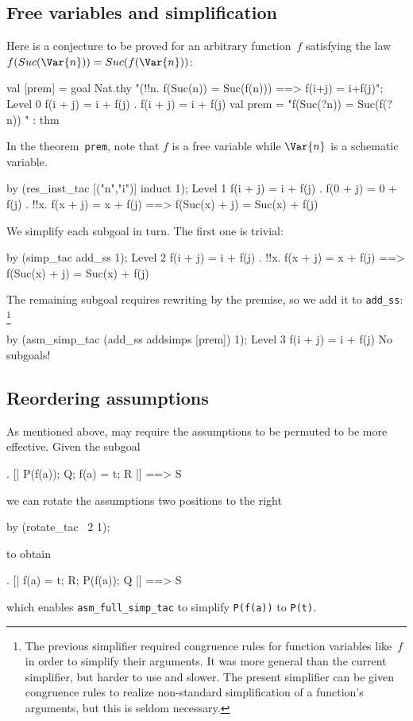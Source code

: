 \subsection{Free variables and simplification}
Here is a conjecture to be proved for an arbitrary function~$f$ satisfying
the law $f(Suc(\Var{n})) = Suc(f(\Var{n}))$:
\begin{ttbox}
val [prem] = goal Nat.thy
    "(!!n. f(Suc(n)) = Suc(f(n))) ==> f(i+j) = i+f(j)";
{\out Level 0}
{\out f(i + j) = i + f(j)}
{. f(i + j) = i + f(j)}
\ttbreak
{\out val prem = "f(Suc(?n)) = Suc(f(?n))}
{\out             [!!n. f(Suc(n)) = Suc(f(n))]" : thm}
\end{ttbox}
In the theorem~{\tt prem}, note that $f$ is a free variable while
$\Var{n}$ is a schematic variable.
\begin{ttbox}
by (res_inst_tac [("n","i")] induct 1);
{\out Level 1}
{\out f(i + j) = i + f(j)}
{. f(0 + j) = 0 + f(j)}
{. !!x. f(x + j) = x + f(j) ==> f(Suc(x) + j) = Suc(x) + f(j)}
\end{ttbox}
We simplify each subgoal in turn.  The first one is trivial:
\begin{ttbox}
by (simp_tac add_ss 1);
{\out Level 2}
{\out f(i + j) = i + f(j)}
{. !!x. f(x + j) = x + f(j) ==> f(Suc(x) + j) = Suc(x) + f(j)}
\end{ttbox}
The remaining subgoal requires rewriting by the premise, so we add it to
{\tt add_ss}:%
\footnote{The previous simplifier required congruence rules for function
  variables like~$f$ in order to simplify their arguments.  It was more
  general than the current simplifier, but harder to use and slower.  The
  present simplifier can be given congruence rules to realize non-standard
  simplification of a function's arguments, but this is seldom necessary.}
\begin{ttbox}
by (asm_simp_tac (add_ss addsimps [prem]) 1);
{\out Level 3}
{\out f(i + j) = i + f(j)}
{\out No subgoals!}
\end{ttbox}

\subsection{Reordering assumptions}
\label{sec:reordering-asms}

As mentioned above,  may require the assumptions
to be permuted to be more effective. Given the subgoal
\begin{ttbox}
{. [| P(f(a)); Q; f(a) = t; R |] ==> S}
\end{ttbox}
we can rotate the assumptions two positions to the right
\begin{ttbox}
by (rotate_tac ~2 1);
\end{ttbox}
to obtain
\begin{ttbox}
{. [| f(a) = t; R; P(f(a)); Q |] ==> S}
\end{ttbox}
which enables \verb$asm_full_simp_tac$ to simplify \verb$P(f(a))$ to
\verb$P(t)$.

